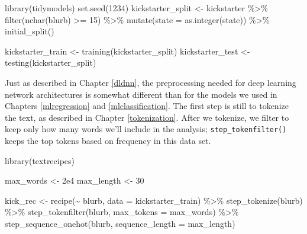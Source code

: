 \documentclass[
]{krantz}
\makeatletter
\newenvironment{Shaded}{\begin{snugshade}}{\end{snugshade}}
\newcommand{\AttributeTok}[1]{\textcolor[rgb]{0.77,0.63,0.00}{#1}}
\newcommand{\DecValTok}[1]{\textcolor[rgb]{0.00,0.00,0.81}{#1}}
\newcommand{\FloatTok}[1]{\textcolor[rgb]{0.00,0.00,0.81}{#1}}
\newcommand{\FunctionTok}[1]{\textcolor[rgb]{0.00,0.00,0.00}{#1}}
\newcommand{\NormalTok}[1]{#1}
\newcommand{\OtherTok}[1]{\textcolor[rgb]{0.56,0.35,0.01}{#1}}
\newcommand{\SpecialCharTok}[1]{\textcolor[rgb]{0.00,0.00,0.00}{#1}}
\newenvironment{kframe}{%
\medskip{}
\setlength{\fboxsep}{.8em}
 \def\at@end@of@kframe{}%
 \ifinner\ifhmode%
  \def\at@end@of@kframe{\end{minipage}}%
  \begin{minipage}{\columnwidth}%
 \fi\fi%
 \def\FrameCommand##1{\hskip\@totalleftmargin \hskip-\fboxsep
 \colorbox{shadecolor}{##1}\hskip-\fboxsep
     \hskip-\linewidth \hskip-\@totalleftmargin \hskip\columnwidth}%
 \MakeFramed {\advance\hsize-\width
   \@totalleftmargin\z@ \linewidth\hsize
   \@setminipage}}%
 {\par\unskip\endMakeFramed%
 \at@end@of@kframe}
\renewenvironment{Shaded}{\begin{kframe}}{\end{kframe}}
\makeatother
\begin{document}
\begin{Shaded}
\begin{Highlighting}[]
\FunctionTok{library}\NormalTok{(tidymodels)}
\FunctionTok{set.seed}\NormalTok{(}\DecValTok{1234}\NormalTok{)}
\NormalTok{kickstarter\_split }\OtherTok{\textless{}{-}}\NormalTok{ kickstarter }\SpecialCharTok{\%\textgreater{}\%}
  \FunctionTok{filter}\NormalTok{(}\FunctionTok{nchar}\NormalTok{(blurb) }\SpecialCharTok{\textgreater{}=} \DecValTok{15}\NormalTok{) }\SpecialCharTok{\%\textgreater{}\%}
  \FunctionTok{mutate}\NormalTok{(}\AttributeTok{state =} \FunctionTok{as.integer}\NormalTok{(state)) }\SpecialCharTok{\%\textgreater{}\%}
  \FunctionTok{initial\_split}\NormalTok{()}

\NormalTok{kickstarter\_train }\OtherTok{\textless{}{-}} \FunctionTok{training}\NormalTok{(kickstarter\_split)}
\NormalTok{kickstarter\_test }\OtherTok{\textless{}{-}} \FunctionTok{testing}\NormalTok{(kickstarter\_split)}
\end{Highlighting}
\end{Shaded}

Just as described in Chapter \ref{dldnn}, the preprocessing needed for deep learning network architectures is somewhat different than for the models we used in Chapters \ref{mlregression} and \ref{mlclassification}. The first step is still to tokenize the text, as described in Chapter \ref{tokenization}. After we tokenize, we filter to keep only how many words we'll include in the analysis; \texttt{step\_tokenfilter()} keeps the top tokens based on frequency in this data set.

\begin{Shaded}
\begin{Highlighting}[]
\FunctionTok{library}\NormalTok{(textrecipes)}

\NormalTok{max\_words }\OtherTok{\textless{}{-}} \FloatTok{2e4}
\NormalTok{max\_length }\OtherTok{\textless{}{-}} \DecValTok{30}

\NormalTok{kick\_rec }\OtherTok{\textless{}{-}} \FunctionTok{recipe}\NormalTok{(}\SpecialCharTok{\textasciitilde{}}\NormalTok{ blurb, }\AttributeTok{data =}\NormalTok{ kickstarter\_train) }\SpecialCharTok{\%\textgreater{}\%}
  \FunctionTok{step\_tokenize}\NormalTok{(blurb) }\SpecialCharTok{\%\textgreater{}\%}
  \FunctionTok{step\_tokenfilter}\NormalTok{(blurb, }\AttributeTok{max\_tokens =}\NormalTok{ max\_words) }\SpecialCharTok{\%\textgreater{}\%}
  \FunctionTok{step\_sequence\_onehot}\NormalTok{(blurb, }\AttributeTok{sequence\_length =}\NormalTok{ max\_length)}
\end{Highlighting}
\end{Shaded}
\end{document}
